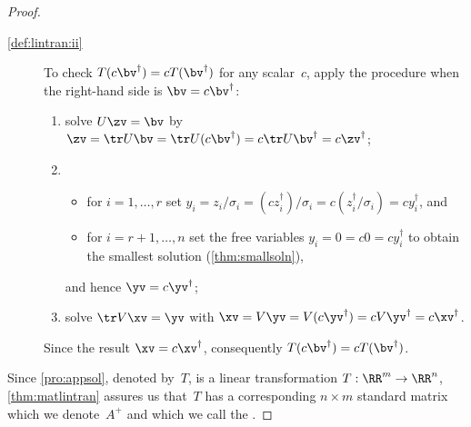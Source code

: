 \begin{proof}
\begin{description}
\item[\ref{def:lintran:ii}]  
To check \(T(c\bv^\dag)=cT(\bv^\dag)\) for any scalar~\(c\), apply the procedure when the right-hand side is \(\bv=c\bv^\dag\):
\begin{enumerate}
\item solve \(U\zv=\bv\) by \(\zv=\tr U\bv=\tr U(c\bv^\dag)=c\tr U\bv^\dag=c\zv^\dag\);
\item \begin{itemize}
\item for \(i=1,\ldots,r\) set \(y_i=z_i/\sigma_i=(cz^\dag_i)/\sigma_i=c(z^\dag_i/\sigma_i)=cy^\dag_i\), and
\item for \(i=r+1,\ldots,n\) set the free variables \(y_i=0=c0=cy^\dag_i\) to obtain the smallest solution (\cref{thm:smallsoln}),
\end{itemize}
and hence \(\yv=c\yv^\dag\);
\item solve \(\tr V\xv=\yv\) with \(\xv=V\yv=V(c\yv^\dag)=cV\yv^\dag=c\xv^\dag\).
\end{enumerate}
Since the result \(\xv=c\xv^\dag\), consequently \(T(c\bv^\dag)=cT(\bv^\dag)\).
\end{description}
Since \cref{pro:appsol}, denoted by~\(T\), is a linear transformation \(T:\RR^m\to\RR^n\), \cref{thm:matlintran} assures us that~\(T\) has a corresponding \(n\times m\) standard matrix which we denote~\(A^+\) and which we call the .
\end{proof}




